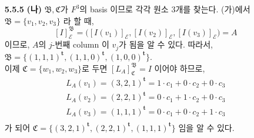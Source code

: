 \documentclass{article}
\newcommand*{\trans}{^{\mathrm{\mathbf{t}}}}%
\newcommand*{\basisB}{\mathfrak{B}}%
\newcommand*{\basisC}{\mathfrak{C}}%
\begin{document}
\begin{itemize}
(ii) $[L]^{\basisC}_{\basisB}$
$$
	\begin{aligned}
		L(w_1) = (1, 0, 0)\trans = b_{11}v_1 + b_{21}v_2 + b_{31}v_3\\
		L(w_2) = (0, 0, 0)\trans = b_{12}v_1 + b_{22}v_2 + b_{32}v_3\\
		L(w_3) = (0, 2, 2)\trans = b_{13}v_1 + b_{23}v_2 + b_{33}v_3
	\end{aligned}
$$
를 만족하는 $b_{ij} \in F$를 찾아주면 된다. 계산을 해보면
$$
[L]_{\basisB}^{\basisC} = 
	\begin{pmatrix}
		1/2 & 0 & -1/2\\
		1/2 & 0 & 1/2\\
		-1/2 & 0 & 3/2 
	\end{pmatrix}
$$ 이다.

(iii) $[L^2]^{\basisB}_{\basisB}$
$$L^2((x, y, z)\trans) = L((x-y, z, 2z)\trans)=(x-y-z, 2z, 4z)\trans$$
이므로,
$$
	\begin{aligned}
		L^2(v_1) = (0, 0, 0)\trans = c_{11}v_1 + c_{21}v_2 + c_{31}v_3\\
		L^2(v_2) = (0, 2, 4)\trans = c_{12}v_1 + c_{22}v_2 + c_{32}v_3\\
		L^2(v_3) = (-2, 2, 4)\trans = c_{13}v_1 + c_{23}v_2 + c_{33}v_3
	\end{aligned}
$$
를 만족하는 $c_{ij} \in F$를 찾아주면 된다. 계산을 해보면
$$
[L^2]_{\basisB}^{\basisB} = 
	\begin{pmatrix}
		0 & -1 & -2\\
		0 & 1 & 0\\
		0 & 3 & 4 
	\end{pmatrix}
$$
이다.

\item[\textbf{5.5.5}] \textbf{(나)}
$\basisB, \basisC$가 $F^3$의 basis 이므로 각각 원소 $3$개를 찾는다.
(가)에서 $\basisB=\{v_1, v_2, v_3\}$ 라 할 때,
$$[I]_{\mathcal{E}}^{\basisB} = \big([I(v_1)]_{\mathcal{E}}, [I(v_2)]_{\mathcal{E}}, [I(v_3)]_{\mathcal{E}}\big)=A$$
이므로, $A$의 $j$-번째 column 이 $v_j$가 됨을 알 수 있다.
따라서, $\basisB=\{(1, 1, 1)\trans, (1, 1, 0)\trans, (1, 0, 0)\trans \}$.\\
이제 $\basisC = \{w_1, w_2, w_3\}$로 두면 $[L_A]_{\basisC}^{\basisB} = I$ 이어야 하므로,
$$
	\begin{aligned}
		L_A(v_1) = (3, 2, 1)\trans = 1\cdot c_1 + 0\cdot c_2 + 0\cdot c_3\\
		L_A(v_2) = (2, 2, 1)\trans = 0\cdot c_1 + 1\cdot c_2 + 0\cdot c_3\\
		L_A(v_3) = (1, 1, 1)\trans = 0\cdot c_1 + 0\cdot c_2 + 1\cdot c_3\\
	\end{aligned}
$$
가 되어 $\basisC = \{(3, 2, 1)\trans, (2, 2, 1)\trans, (1, 1, 1)\trans\}$ 임을 알 수 있다.


\end{itemize}
\end{document}
